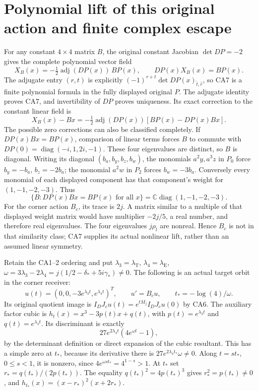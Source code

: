 \documentclass[11pt]{article}
\newcommand{\C}{\mathbb C}
\begin{document}
\section{Polynomial lift of this original action and finite complex escape}
For any constant $4\times4$ matrix $B$, the original constant
Jacobian $\det DP=-2$ gives the complete polynomial vector field
\[
 X_B(x)=-\tfrac12\operatorname{adj}(DP(x))\,BP(x),\qquad
 DP(x)X_B(x)=BP(x). \tag{CA7}
\]
The adjugate entry $(r,t)$ is explicitly
$(-1)^{r+t}\det DP(x)_{\widehat t,\widehat r}$, so CA7 is a
finite polynomial formula in the fully displayed original $P$.
The adjugate identity proves CA7, and invertibility of $DP$
proves uniqueness. Its exact correction to the constant linear
field is
\[
 X_B(x)-Bx=-\tfrac12\operatorname{adj}(DP(x))
                         [BP(x)-DP(x)Bx]. \tag{CA8}
\]
The possible zero corrections can also be classified completely.
If $DP(x)Bx=BP(x)$, comparison of linear terms forces $B$ to
commute with $DP(0)=\operatorname{diag}(-i,1,2i,-1)$.
These four eigenvalues are distinct, so $B$ is diagonal.
Writing its diagonal $(b_a,b_y,b_z,b_w)$, the monomials
$a^2y,a^3z$ in $P_0$ force $b_y=-b_a$, $b_z=-2b_a$;
the monomial $a^2w$ in $P_2$ forces $b_w=-3b_a$.
Conversely every monomial of each displayed component has
that component's weight for $(1,-1,-2,-3)$. Thus
\[
 \{B:DP(x)Bx=BP(x)\text{ for all }x\}
       =\C\operatorname{diag}(1,-1,-2,-3). \tag{CA9}
\]
For the corner action $B_c$, its trace is $2j$. A matrix
similar to a multiple of that displayed weight matrix would
have multiplier $-2j/5$, a real number, and therefore real
eigenvalues. The four eigenvalues $j\rho_l$ are nonreal.
Hence $B_c$ is not in that similarity class; CA7 supplies its
actual nonlinear lift, rather than an assumed linear symmetry.

Retain the CA1--2 ordering and put $\lambda_3=\lambda_\mathrm T$,
$\lambda_4=\lambda_\mathrm E$,
$\omega=3\lambda_3-2\lambda_4
=j(1/2-\delta_*+5i\gamma_*)\ne0$.
The following is an actual target orbit in the corner receiver:
\[
 u(t)=(0,0,-3e^{\lambda_3t},e^{\lambda_4t})^T,\qquad
 u'=B_cu,\qquad
 t_*=-\log(4)/\omega. \tag{CA10}
\]
Its original quotient image is $I_DJ_cu(t)=
e^{tM_j}I_DJ_cu(0)$ by CA6. The auxiliary factor cubic is
$h_t(x)=x^3-3p(t)x+q(t)$, with
$p(t)=e^{\lambda_3t}$ and $q(t)=e^{\lambda_4t}$.
Its discriminant is exactly
\[
 27e^{2\lambda_4t}(4e^{\omega t}-1), \tag{CA11}
\]
by the determinant definition or direct expansion of the cubic
resultant. This has a simple zero at $t_*$, because its
derivative there is $27e^{2\lambda_4t_*}\omega\ne0$.
Along $t=st_*$, $0\le s<1$, it is nonzero, since
$4e^{\omega st_*}=4^{1-s}>1$.
At $t_*$ set $r_*=q(t_*)/(2p(t_*))$. The equality
$q(t_*)^2=4p(t_*)^3$ gives $r_*^2=p(t_*)\ne0$,
and $h_{t_*}(x)=(x-r_*)^2(x+2r_*)$.
\end{document}

